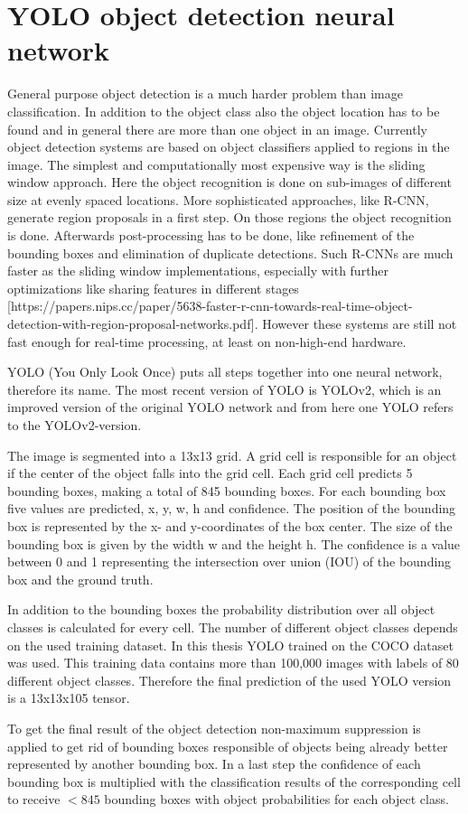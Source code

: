 \section{YOLO object detection neural network}

General purpose object detection is a much harder problem than image classification. In addition to the object class also the object location has to be found and in general there are more than one object in an image. Currently object detection systems are based on object classifiers applied to regions in the image. The simplest and computationally most expensive way is the sliding window approach. Here the object recognition is done on sub-images of different size at evenly spaced locations. More sophisticated approaches, like R-CNN, generate region proposals in a first step. On those regions the object recognition is done. Afterwards post-processing has to be done, like refinement of the bounding boxes and elimination of duplicate detections. Such R-CNNs are much faster as the sliding window implementations, especially with further optimizations like sharing features in different stages [https://papers.nips.cc/paper/5638-faster-r-cnn-towards-real-time-object-detection-with-region-proposal-networks.pdf]. However these systems are still not fast enough for real-time processing, at least on non-high-end hardware.

YOLO (You Only Look Once) puts all steps together into one neural network, therefore its name. The most recent version of YOLO is YOLOv2, which is an improved version of the original YOLO network and from here one YOLO refers to the YOLOv2-version. 

The image is segmented into a 13x13 grid. A grid cell is responsible for an object if the center of the object falls into the grid cell. Each grid cell predicts 5 bounding boxes, making a total of 845 bounding boxes. For each bounding box five values are predicted, x, y, w, h and confidence. The position of the bounding box is represented by the x- and y-coordinates of the box center. The size of the bounding box is given by the width w and the height h. The confidence is a value between 0 and 1 representing the intersection over union (IOU) of the bounding box and the ground truth. 

In addition to the bounding boxes the probability distribution over all object classes is calculated for every cell. The number of different object classes depends on the used training dataset. In this thesis YOLO trained on the COCO dataset was used. This training data contains more than 100,000 images with labels of 80 different object classes. Therefore the final prediction of the used YOLO version is a 13x13x105 tensor. 

To get the final result of the object detection non-maximum suppression is applied to get rid of bounding boxes responsible of objects being already better represented by another bounding box. In a last step the confidence of each bounding box is multiplied with the classification results of the corresponding cell to receive $< 845$ bounding boxes with object probabilities for each object class. 

